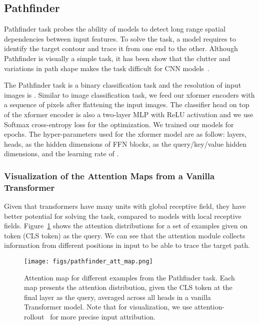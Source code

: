 \documentclass{article} \usepackage{iclr2021_conference,times}
\begin{document}
\subsection{Pathfinder}
Pathfinder task probes the ability of models to detect long range spatial dependencies between input features. To solve the task, a model requires to identify the target contour and trace it from one end to the other. Although Pathfinder is visually a simple task, it has been show that the clutter and variations in path shape makes the task difficult for CNN models~\citep{linsley2018learning, Kim2020Disentangling}. 

The Pathfinder task is a binary classification task and the resolution of input images is . Similar to image classification task, we feed our xformer encoders with a sequence of  pixels after flattening the input images. The classifier head on top of the xformer encoder is also a two-layer  MLP with ReLU activation and we use Softmax cross-entropy loss for the optimization.  We trained our models for  epochs. The hyper-parameters used for the xformer model are as follow:  layers,  heads,  as the hidden dimensions of FFN blocks,  as the query/key/value hidden dimensions, and the learning rate of .




\subsubsection{Visualization of the Attention Maps from a Vanilla Transformer}
Given that transformers have many units with global receptive field, they have better potential for solving the task, compared to models with local receptive fields. Figure~\ref{fig:pathfinder_attmap_visualization} shows the attention distributions for a set of examples given on token (CLS token) as the query. We can see that the attention module collects information from different positions in input to be able to trace the target path.

\begin{figure}[h!]
    \centering
    \texttt{[image: figs/pathfinder\_att\_map.png]}
    \caption{Attention map for different examples from the Pathfinder task. Each map presents the attention distribution, given the CLS token at the final layer as the query, averaged across all heads in a vanilla Transformer model. Note that for visualization, we use attention-rollout~\citep{abnar-zuidema-2020-quantifying} for more precise input attribution.}
    \label{fig:pathfinder_attmap_visualization}
\end{figure}
\end{document}
